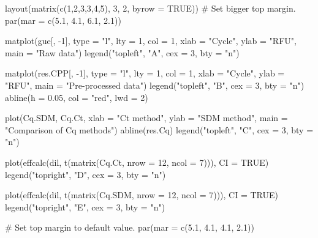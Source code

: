 \begin{example}
layout(matrix(c(1,2,3,3,4,5), 3, 2, byrow = TRUE))
# Set bigger top margin.
par(mar = c(5.1, 4.1, 6.1, 2.1))

matplot(gue[, -1], type = "l", lty = 1, col = 1, xlab = "Cycle", 
	    ylab = "RFU", main = "Raw data")
legend("topleft", "A", cex = 3, bty = "n")

matplot(res.CPP[, -1], type = "l", lty = 1, col = 1, xlab = "Cycle", 
	ylab = "RFU", main = "Pre-processed data")
legend("topleft", "B", cex = 3, bty = "n")
abline(h = 0.05, col = "red", lwd = 2)

plot(Cq.SDM, Cq.Ct, xlab = "Ct method", ylab = "SDM method", 
     main = "Comparison of Cq methods")
abline(res.Cq)
legend("topleft", "C", cex = 3, bty = "n")

plot(effcalc(dil, t(matrix(Cq.Ct, nrow = 12, ncol = 7))), CI = TRUE)
legend("topright", "D", cex = 3, bty = "n")

plot(effcalc(dil, t(matrix(Cq.SDM, nrow = 12, ncol = 7))), CI = TRUE)
legend("topright", "E", cex = 3, bty = "n")

# Set top margin to default value.
par(mar = c(5.1, 4.1, 4.1, 2.1))
\end{example}

